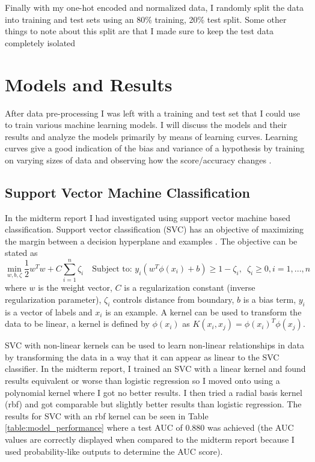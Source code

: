 \documentclass[11pt]{article}
\begin{document}
Finally with my one-hot encoded and normalized data, I randomly split the data into training and test sets using an 80\% training, 20\% test split.
Some other things to note about this split are that I made sure to keep the test data completely isolated 

\section*{Models and Results}
After data pre-processing I was left with a training and test set that I could use to train various machine learning models.
I will discuss the models and their results and analyze the models primarily by means of learning curves.
Learning curves give a good indication of the bias and variance of a hypothesis by training on varying sizes of data and observing how the score/accuracy changes \cite{ng_advice_nodate}. 

\subsection*{Support Vector Machine Classification}
In the midterm report I had investigated using support vector machine based classification. 
Support vector classification (SVC) has an objective of maximizing the margin between a decision hyperplane and examples \cite{noauthor_14_nodate}.
The objective can be stated as 
\[
    \min_ {w, b, \zeta} \frac{1}{2} w^T w + C \sum_{i=1}^{n} \zeta_i
    \quad\text{Subject to: } y_i (w^T \phi (x_i) + b) \geq 1 - \zeta_i,\enspace
    \zeta_i \geq 0, i=1, ..., n
\]
where $w$ is the weight vector, $C$ is a regularization constant (inverse regularization parameter), $\zeta_i$ controls distance from boundary, $b$ is a bias term, $y_i$ is a vector of labels and $x_i$ is an example.
A kernel can be used to transform the data to be linear, a kernel is defined by $\phi (x_i)$ as $K(x_i, x_j) = \phi (x_i)^T \phi (x_j)$.

SVC with non-linear kernels can be used to learn non-linear relationships in data by transforming the data in a way that it can appear as linear to the SVC classifier. 
In the midterm report, I trained an SVC with a linear kernel and found results equivalent or worse than logistic regression so I moved onto using a polynomial kernel where I got no better results.
I then tried a radial basis kernel (rbf) and got comparable but slightly better results than logistic regression.
The results for SVC with an rbf kernel can be seen in Table \ref{table:model_performance} where a test AUC of 0.880 was achieved (the AUC values are correctly displayed when compared to the midterm report because I used probability-like outputs to determine the AUC score). 
\end{document}
